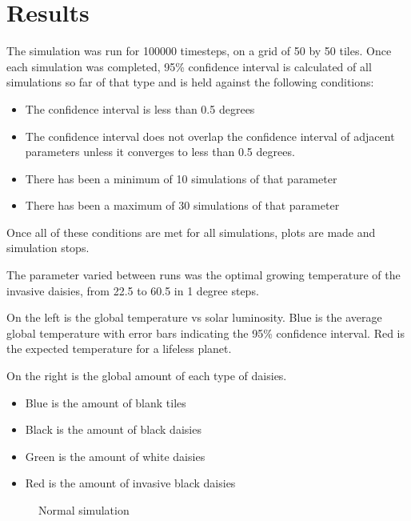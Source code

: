 \documentclass[12pt]{article}
\begin{document}
\section{Results}
The simulation was run for 100000 timesteps, on a grid of 50 by 50
tiles. Once each simulation was completed, 95\% confidence interval is
calculated of all simulations so far of that type and is held against
the following conditions:
\begin{itemize}
\item The confidence interval is less than 0.5 degrees
\item The confidence interval does not overlap the confidence interval
  of adjacent parameters unless it converges to less than 0.5 degrees.
\item There has been a minimum of 10 simulations of that parameter
\item There has been a maximum of 30 simulations of that parameter
\end{itemize}

Once all of these conditions are met for all simulations, plots are
made and simulation stops.

The parameter varied between runs was the optimal growing temperature
of the invasive daisies, from 22.5 to 60.5 in 1 degree steps.

On the left is the global temperature vs solar luminosity.
Blue is the average global temperature with error bars indicating the
95\% confidence interval. Red is the expected temperature for a
lifeless planet.

On the right is the global amount of each type of daisies.
\begin{itemize}
\item Blue is the amount of blank tiles
\item Black is the amount of black daisies
\item Green is the amount of white daisies
\item Red is the amount of invasive black daisies
\end{itemize}

\begin{figure}[H]
  \centering
  \hfill
  \caption{Normal simulation}
\end{figure}
\end{document}
